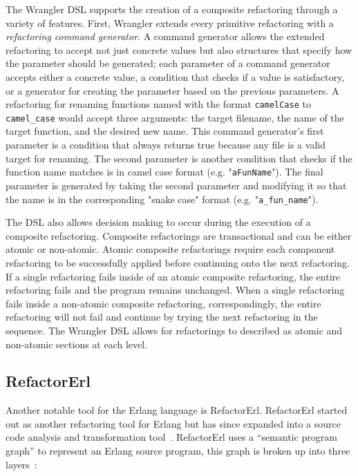 The Wrangler DSL supports the creation of a composite refactoring through a variety of features. First, Wrangler extends every primitive refactoring with a \textit{refactoring command generator}. A command generator allows the extended refactoring to accept not just concrete values but also structures that specify how the parameter should be generated; each parameter of a command generator accepts either a concrete value, a condition that checks if a value is satisfactory, or a generator for creating the parameter based on the previous parameters. A refactoring for renaming functions named with the format \texttt{camelCase} to \texttt{camel\_case} would accept three arguments: the target filename, the name of the target function, and the desired new name. This command generator's first parameter is a condition that always returns true because any file is a valid target for renaming. The second parameter is another condition that checks if the function name matches is in camel case format (e.g. "\texttt{aFunName}"). The final parameter is generated by taking the second parameter and modifying it so that the name is in the corresponding "snake case" format (e.g. "\texttt{a\_fun\_name}"). 

The DSL also allows decision making to occur during the execution of a composite refactoring. Composite refactorings are transactional and can be either atomic or non-atomic. Atomic composite refactorings require each component refactoring to be successfully applied before continuing onto the next refactoring. If a single refactoring fails inside of an atomic composite refactoring, the entire refactoring fails and the program remains unchanged. When a single refactoring fails inside a non-atomic composite refactoring, correspondingly, the entire refactoring will not fail and continue by trying the next refactoring in the sequence. The Wrangler DSL allows for refactorings to described as atomic and non-atomic sections at each level.  

\subsection{RefactorErl}\label{refactorErl}

Another notable tool for the Erlang language is RefactorErl. RefactorErl started out as another refactoring tool for Erlang but has since expanded into a source code analysis and transformation tool~\citep{refactorErl}. RefactorErl uses a ``semantic program graph'' to represent an Erlang source program, this graph is broken up into three layers~\citep{erlangStatic}:

